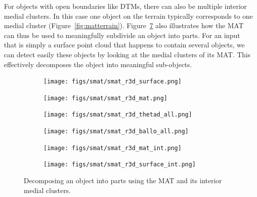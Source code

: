 For objects with open boundaries like DTMs, there can also be multiple interior medial clusters.
In this case one object on the terrain typically corresponds to one medial cluster (Figure~\ref{fig:matterrain}).
Figure~\ref{fig:smat_r3d_int} also illustrates how the MAT can thus be used to meaningfully subdivide an object into parts.
For an input that is simply a surface point cloud that happens to contain several objects, we can detect easily these objects by looking at the medial clusters of its MAT\@.
This effectively decomposes the object into meaningful sub-objects.
\begin{figure}
	\begin{subfigure}[t]{0.45\linewidth}
		\texttt{[image: figs/smat/smat\_r3d\_surface.png]}
		\label{fig:smat_r3d_surface}
	\end{subfigure}
	\quad
	\begin{subfigure}[t]{0.45\linewidth}
		\texttt{[image: figs/smat/smat\_r3d\_mat.png]}
		\label{fig:smat_r3d_mat}
	\end{subfigure}
	\quad
	\begin{subfigure}[t]{0.45\linewidth}
		\texttt{[image: figs/smat/smat\_r3d\_thetad\_all.png]}
		\label{fig:smat_r3d_sheets_all}
	\end{subfigure}
	\quad
	\begin{subfigure}[t]{0.45\linewidth}
		\texttt{[image: figs/smat/smat\_r3d\_ballo\_all.png]}
		\label{fig:smat_r3d_ballo_all}
	\end{subfigure}
	\quad
	\begin{subfigure}[t]{0.45\linewidth}
		\texttt{[image: figs/smat/smat\_r3d\_mat\_int.png]}
		\label{fig:smat_r3d_ballo_int}
	\end{subfigure}
	\quad
	\begin{subfigure}[t]{0.45\linewidth}
		\texttt{[image: figs/smat/smat\_r3d\_surface\_int.png]}
		\label{fig:smat_r3d_surface_int}
	\end{subfigure}
	\caption[Decomposing an object into parts using the MAT]{Decomposing an object into parts using the MAT and its interior medial clusters.}
	\label{fig:smat_r3d_int}
\end{figure}

